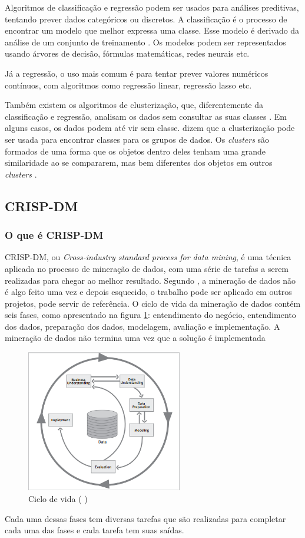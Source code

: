 Algoritmos de classificação e regressão podem ser usados para análises preditivas, tentando prever dados categóricos ou discretos. A classificação é o processo de encontrar um modelo que melhor expressa uma classe. Esse modelo é derivado da análise de um conjunto de treinamento \citep{jmj}. Os modelos podem ser representados usando árvores de decisão, fórmulas matemáticas, redes neurais etc.

Já a regressão, o uso mais comum é para tentar prever valores numéricos contínuos, com algoritmos como regressão linear, regressão lasso etc.

Também existem os algoritmos de clusterização, que, diferentemente da classificação e regressão, analisam os dados sem consultar as suas classes \citep{jmj}. Em alguns casos, os dados podem até vir sem classe. \citeauthor{jmj} dizem que a clusterização pode ser usada para encontrar classes para os grupos de dados. Os \textit{clusters} são formados de uma forma que os objetos dentro deles tenham uma grande similaridade ao se compararem, mas bem diferentes dos objetos em outros \textit{clusters} \citep{jmj}.

\subsection{CRISP-DM}
\subsubsection{O que é CRISP-DM}
CRISP-DM, ou\textit{ Cross-industry standard process for data mining}, é uma técnica aplicada no processo de mineração de dados, com uma série de tarefas a serem realizadas para chegar ao melhor resultado.
Segundo , a mineração de dados não é algo feito uma vez e depois esquecido, o trabalho pode ser aplicado em outros projetos, pode servir de referência.
O ciclo de vida da mineração de dados contém seis fases, como apresentado na figura \ref{crispcycle}: entendimento do negócio, entendimento dos dados, preparação dos dados, modelagem, avaliação e implementação. 
A mineração de dados não termina uma vez que a solução é implementada \citep{crispmanual}
\begin{figure}[H]
\centering
\includegraphics[height=6.2cm]{imagens/lifecycle.png}
\caption{Ciclo de vida (\citeauthor{crispmanual} \citeyear{crispmanual})}
\label{crispcycle}
\end{figure}
Cada uma dessas fases tem diversas tarefas que são realizadas para completar cada uma das fases e cada tarefa tem suas saídas.
